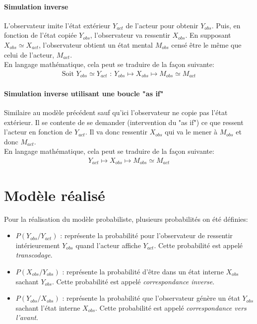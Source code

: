 \documentclass[overfullbox, poster]{polytech/polytech}
\begin{document}
\paragraph{Simulation inverse}
L'observateur imite l'état extérieur $Y_{act}$ de l'acteur pour obtenir $Y_{obs}$. Puis, en fonction de l'état copiée $Y_{obs}$, l'observateur va ressentir $X_{obs}$. En supposant $X_{obs}\simeq X_{act}$, l'observateur obtient un état mental $M_{obs}$ censé être le même que celui de l'acteur, $M_{act}$.\\
En langage mathématique, cela peut se traduire de la façon suivante:
\begin{align*}
\text{Soit }Y_{obs}\simeq Y_{act}\text{ : } Y_{obs}\mapsto X_{obs}\mapsto M_{obs}\simeq M_{act}
\end{align*}

\paragraph{Simulation inverse utilisant une boucle "as if"}
Similaire au modèle précédent sauf qu'ici l'observateur ne copie pas l'état extérieur. Il se contente de se demander (intervention du "as if") ce que ressent l'acteur en fonction de $Y_{act}$. Il va donc ressentir $X_{obs}$ qui va le mener à $M_{obs}$ et donc $M_{act}$.\\
En langage mathématique, cela peut se traduire de la façon suivante:
\begin{align*}
Y_{act}\mapsto X_{obs}\mapsto M_{obs}\simeq M_{act}
\end{align*}

\section{Modèle réalisé}
Pour la réalisation du modèle probabiliste, plusieurs probabilités on été définies:
\begin{itemize}
\item $P(Y_{obs}/Y_{act})$ : représente la probabilité pour l'observateur de ressentir intérieurement $Y_{obs}$ quand l'acteur affiche $Y_{act}$. Cette probabilité est appelé \textit{transcodage}.
\item $P(X_{obs}/Y_{obs})$ : représente la probabilité d'être dans un état interne $X_{obs}$ sachant $Y_{obs}$. Cette probabilité est appelé \textit{correspondance inverse}.
\item $P(Y_{obs}/X_{obs})$ : représente la probabilité que l'observateur génère un état $Y_{obs}$ sachant l'état interne $X_{obs}$. Cette probabilité est appelé \textit{correspondance vers l'avant}.\\
\end{itemize}
\end{document}
